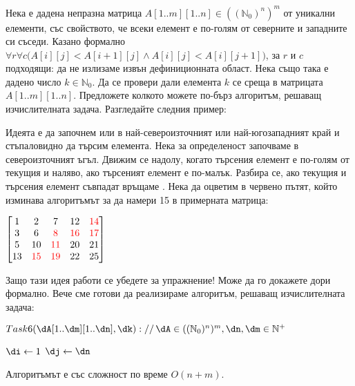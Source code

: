 \begin{problem}
	Нека е дадена непразна матрица $A[1..m][1..n]\in((\mathbb{N}_0)^n)^m$ от уникални елементи, със свойството, че всеки елемент е по-голям от северните и западните си съседи. Казано формално $\forall r\forall c\big(A[i][j]<A[i+1][j]\land A[i][j]<A[i][j+1]\big)$, за $r$ и $c$ подходящи: да не излизаме извън дефиниционната област. Нека също така е дадено число $k\in\mathbb{N}_0$. Да се провери дали елемента $k$ се среща в матрицата $A[1..m][1..n]$. Предложете колкото можете по-бърз алгоритъм, решаващ изчислителната задача. Разгледайте следния пример:
\end{problem}
\begin{solution}
	Идеята е да започнем или в най-североизточният или най-югозападният край и стъпаловидно да търсим елемента. Нека за определеност започваме в североизточният ъгъл. Движим се надолу, когато търсения елемент е по-голям от текущия и наляво, ако търсеният елемент е по-малък. Разбира се, ако текущия и търсения елемент съвпадат връщаме . Нека да оцветим в червено пътят, който изминава алгоритъмът за да намери 15 в примерната матрица:
	\begin{center}
		$\begin{bmatrix}
			1 &  2 &  7 & 12 & \textcolor{red}{14}\\
			3 &  6 &  \textcolor{red}8 & \textcolor{red}{16} & \textcolor{red}{17}\\
			5 & 10 & \textcolor{red}{11} & 20 & 21\\
			13 & \textcolor{red}{15} & \textcolor{red}{19} & 22 & 25
		 \end{bmatrix}$
	\end{center}
	Защо тази идея работи се убедете за упражнение! Може да го докажете дори формално. Вече сме готови да реализираме алгоритъм, решаващ изчислителната задача:
	\begin{pseudocode}
		
		$Task6(\dA[1..\dm][1..\dn],\dk)://\,\dA\in((\mathbb{N}_0)^n)^m,\dn,\dm\in\mathbb{N}^+$
		\Mybegin
		{
			$\di\leftarrow1$\;
			$\dj\leftarrow\dn$\;
			
			{
				\If{$\dA[\di][\dj]=\dk$}{\KwRet{\True\;}}
			}
			\KwRet{\False\;}
		}
	\end{pseudocode}
	Алгоритъмът е със сложност по време $O(n+m)$.
\end{solution}\newpage

